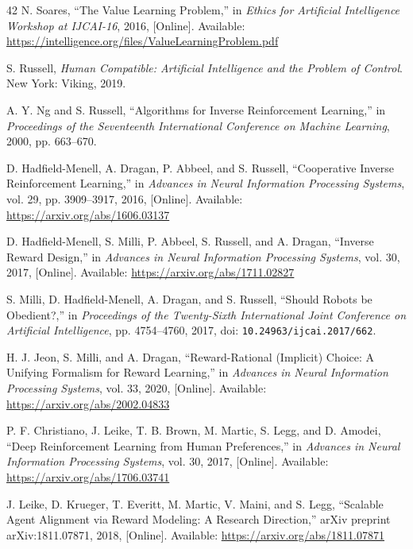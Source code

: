 \begin{thebibliography}{42}
N. Soares, ``The Value Learning Problem,'' in \emph{Ethics for Artificial Intelligence Workshop at IJCAI-16}, 2016, [Online]. Available: \url{https://intelligence.org/files/ValueLearningProblem.pdf}

S. Russell, \emph{Human Compatible: Artificial Intelligence and the Problem of Control}. New York: Viking, 2019.

A. Y. Ng and S. Russell, ``Algorithms for Inverse Reinforcement Learning,'' in \emph{Proceedings of the Seventeenth International Conference on Machine Learning}, 2000, pp. 663--670.

D. Hadfield-Menell, A. Dragan, P. Abbeel, and S. Russell, ``Cooperative Inverse Reinforcement Learning,'' in \emph{Advances in Neural Information Processing Systems}, vol. 29, pp. 3909--3917, 2016, [Online]. Available: \url{https://arxiv.org/abs/1606.03137}

D. Hadfield-Menell, S. Milli, P. Abbeel, S. Russell, and A. Dragan, ``Inverse Reward Design,'' in \emph{Advances in Neural Information Processing Systems}, vol. 30, 2017, [Online]. Available: \url{https://arxiv.org/abs/1711.02827}

S. Milli, D. Hadfield-Menell, A. Dragan, and S. Russell, ``Should Robots be Obedient?,'' in \emph{Proceedings of the Twenty-Sixth International Joint Conference on Artificial Intelligence}, pp. 4754--4760, 2017, doi: \nolinkurl{10.24963/ijcai.2017/662}.

H. J. Jeon, S. Milli, and A. Dragan, ``Reward-Rational (Implicit) Choice: A Unifying Formalism for Reward Learning,'' in \emph{Advances in Neural Information Processing Systems}, vol. 33, 2020, [Online]. Available: \url{https://arxiv.org/abs/2002.04833}

P. F. Christiano, J. Leike, T. B. Brown, M. Martic, S. Legg, and D. Amodei, ``Deep Reinforcement Learning from Human Preferences,'' in \emph{Advances in Neural Information Processing Systems}, vol. 30, 2017, [Online]. Available: \url{https://arxiv.org/abs/1706.03741}

J. Leike, D. Krueger, T. Everitt, M. Martic, V. Maini, and S. Legg, ``Scalable Agent Alignment via Reward Modeling: A Research Direction,'' arXiv preprint arXiv:1811.07871, 2018, [Online]. Available: \url{https://arxiv.org/abs/1811.07871}


\end{thebibliography}
